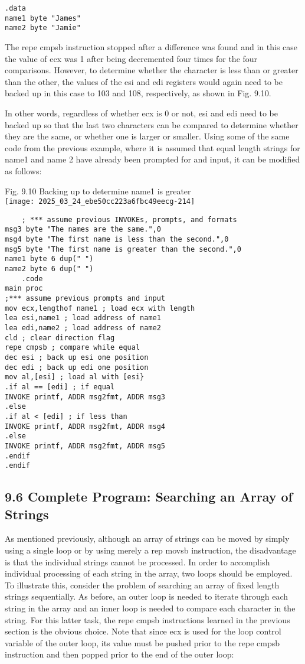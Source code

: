 \documentclass[10pt]{article}
\begin{document}
\begin{verbatim}
.data
name1 byte "James"
name2 byte "Jamie"
\end{verbatim}

The repe cmpsb instruction stopped after a difference was found and in this case the value of ecx was 1 after being decremented four times for the four comparisons. However, to determine whether the character is less than or greater than the other, the values of the esi and edi registers would again need to be backed up in this case to 103 and 108, respectively, as shown in Fig. 9.10.

In other words, regardless of whether ecx is 0 or not, esi and edi need to be backed up so that the last two characters can be compared to determine whether they are the same, or whether one is larger or smaller. Using some of the same code from the previous example, where it is assumed that equal length strings for name1 and name 2 have already been prompted for and input, it can be modified as follows:

Fig. 9.10 Backing up to determine name1 is greater\\
\texttt{[image: 2025\_03\_24\_ebe50cc223a6fbc49eecg-214]}

\begin{verbatim}
    ; *** assume previous INVOKEs, prompts, and formats
msg3 byte "The names are the same.",0
msg4 byte "The first name is less than the second.",0
msg5 byte "The first name is greater than the second.",0
name1 byte 6 dup(" ")
name2 byte 6 dup(" ")
    .code
main proc
;*** assume previous prompts and input
mov ecx,lengthof name1 ; load ecx with length
lea esi,name1 ; load address of name1
lea edi,name2 ; load address of name2
cld ; clear direction flag
repe cmpsb ; compare while equal
dec esi ; back up esi one position
dec edi ; back up edi one position
mov al,[esi] ; load al with [esi}
.if al == [edi] ; if equal
INVOKE printf, ADDR msg2fmt, ADDR msg3
.else
.if al < [edi] ; if less than
INVOKE printf, ADDR msg2fmt, ADDR msg4
.else
INVOKE printf, ADDR msg2fmt, ADDR msg5
.endif
.endif
\end{verbatim}

\subsection*{9.6 Complete Program: Searching an Array of Strings}
As mentioned previously, although an array of strings can be moved by simply using a single loop or by using merely a rep movsb instruction, the disadvantage is that the individual strings cannot be processed. In order to accomplish individual processing of each string in the array, two loops should be employed. To illustrate this, consider the problem of searching an array of fixed length strings sequentially. As before, an outer loop is needed to iterate through each string in the array and an inner loop is needed to compare each character in the string. For this latter task, the repe cmpsb instructions learned in the previous section is the obvious choice. Note that since ecx is used for the loop control variable of the outer loop, its value must be pushed prior to the repe cmpsb instruction and then popped prior to the end of the outer loop:
\end{document}
